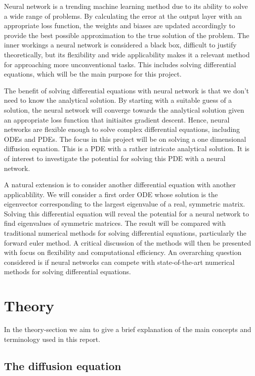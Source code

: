 \documentclass[12pt]{extarticle}
\begin{document}
Neural network is a trending machine learning method due to its ability to solve a wide range of problems. By calculating the error at the output layer with an appropriate loss function, the weights and biases are updated accordingly to provide the best possible approximation to the true solution of the problem. The inner workings a neural network is considered a black box, difficult to justify theoretically, but its flexibility and wide applicability makes it a relevant method for approaching more unconventional tasks. This includes solving differential equations, which will be the main purpose for this project. 

The benefit of solving differential equations with neural network is that we don't need to know the analytical solution. By starting with a suitable guess of a solution, the neural network will converge towards the analytical solution given an appropriate loss function that initiaites gradient descent. Hence, neural networks are flexible enough to solve complex differential equations, including ODEs and PDEs. The focus in this project will be on solving a one dimensional diffusion equation. This is a PDE with a rather intricate analytical solution. It is of interest to investigate the potential for solving this PDE with a neural network.

A natural extension is to consider another differential equation with another applicablility. We will consider a first order ODE whose solution is the eigenvector corresponding to the largest eigenvalue of a real, symmetric matrix. Solving this differential equation will reveal the potential for a neural network to find eigenvalues of symmetric matrices. The result will be compared with traditional numerical methods for solving differential equations, particularly the forward euler method. A critical discussion of the methods will then be presented with focus on flexibility and computational efficiency. An overarching question considered is if neural networks can compete with state-of-the-art numerical methods for solving differential equations.


\section{Theory}
In the theory-section we aim to give a brief explanation of the main concepts and terminology used in this report. 

\subsection{The diffusion equation}
\end{document}
